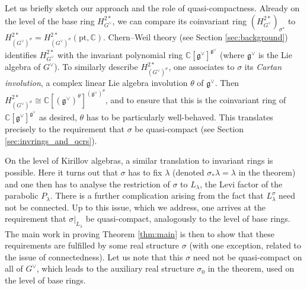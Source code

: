 \documentclass{amsart}
\newcommand{\C}{\mathbb{C}}
\newcommand{\g}{\mathfrak{g}}
\newcommand{\pt}{\text{pt}}
\theoremstyle{definition}
\theoremstyle{plain}
\theoremstyle{remark}
\begin{document}
Let us briefly sketch our approach and the role of quasi-compactness. Already on the level of the base ring $H^{2*}_{G^\vee}$, we can compare its coinvariant ring $(H^{2*}_{G^\vee})_{\sigma^*}$ to $H^{2*}_{(G^\vee)^\sigma} = H^{2*}_{(G^\vee)^\sigma}(\pt,\C)$. Chern--Weil theory (see Section \ref{sec:background}) identifies $H^{2*}_{G^\vee}$ with the invariant polynomial ring $\C[\g^\vee]^{\g^\vee}$ (where $\g^\vee$ is the Lie algebra of $G^\vee$). To similarly describe $H^{2*}_{(G^\vee)^\sigma}$, one associates to $\sigma$ its \emph{Cartan involution}, a complex linear Lie algebra involution $\theta$ of $\g^\vee$. Then $H^{2*}_{(G^\vee)^\sigma} \cong \C[(\g^\vee)^\theta]^{(\g^\vee)^\theta}$, and to ensure that this is the coinvariant ring of $\C[\g^\vee]^{\g^\vee}$ as desired, $\theta$ has to be particularly well-behaved. This translates precisely to the requirement that $\sigma$ be quasi-compact (see Section \ref{sec:invrings_and_qcrs}).

On the level of Kirillov algebras, a similar translation to invariant rings is possible. Here it turns out that $\sigma$ has to fix $\lambda$ (denoted $\sigma_*\lambda = \lambda$ in the theorem) and one then has to analyse the restriction of $\sigma$ to $L_\lambda$, the Levi factor of the parabolic $P_\lambda$. There is a further complication arising from the fact that $L_\lambda^\sigma$ need not be connected. Up to this issue, which we address, one arrives at the requirement that $\sigma|_{L_\lambda}$ be quasi-compact, analogously to the level of base rings. The main work in proving Theorem \ref{thm:main} is then to show that these requirements are fulfilled by some real structure $\sigma$ (with one exception, related to the issue of connectedness). Let us note that this $\sigma$ need not be quasi-compact on all of $G^\vee$, which leads to the auxiliary real structure $\sigma_0$ in the theorem, used on the level of base rings.
\end{document}
